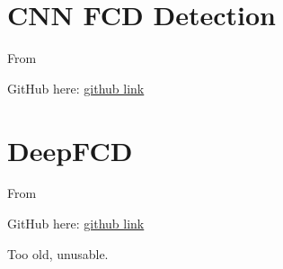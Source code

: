\section{CNN FCD Detection}
\label{code:res16}

From 

GitHub here: \href{https://github.com/alievrusik/cnn_fcd_detection}{github link}

\section{DeepFCD}
\label{code:res18}

From 

GitHub here: \href{https://github.com/NOEL-MNI/deepFCD}{github link}

Too old, unusable.
